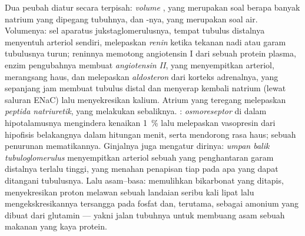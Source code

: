 \begin{definition}[Kendalinya]\label{def:b3:renal-osmoregulation:controls}
%
Dua peubah diatur secara terpisah: \emph{volume}
, yang merupakan soal berapa banyak natrium yang dipegang
tubuhnya, dan \emph{}-nya, yang merupakan soal air. Volumenya:
sel aparatus jukstaglomerulusnya, tempat tubulus distalnya
menyentuh arteriol  sendiri, melepaskan \emph{renin} ketika
tekanan nadi atau garam tubulusnya turun; reninnya memotong angiotensin I
dari sebuah protein plasma, enzim pengubahnya membuat \emph{angiotensin II},
yang menyempitkan arteriol, merangsang haus, dan melepaskan
\emph{aldosteron} dari korteks adrenalnya, yang sepanjang jam membuat
tubulus distal dan  menyerap kembali natrium (lewat saluran
ENaC) lalu menyekresikan kalium. Atrium yang teregang melepaskan
\emph{peptida natriuretik}, yang melakukan sebaliknya. :
\emph{osmoreseptor} di dalam hipotalamusnya mengindera kenaikan \qty{1}{\%} lalu
melepaskan vasopresin dari hipofisis belakangnya dalam hitungan menit, serta
mendorong rasa haus; sebuah penurunan mematikannya. Ginjalnya juga mengatur dirinya:
\emph{umpan balik tubuloglomerulus} menyempitkan arteriol sebuah
 yang penghantaran garam distalnya terlalu tinggi, yang menahan penapisan tiap
 pada apa yang dapat ditangani tubulusnya. Lalu asam--basa:
 memulihkan bikarbonat yang ditapis, 
menyekresikan proton melawan sebuah landaian seribu kali lipat lalu mengekskresikannya
tersangga pada fosfat dan, terutama, sebagai amonium yang dibuat dari
glutamin --- yakni jalan tubuhnya untuk membuang asam sebuah makanan
yang kaya protein.
\end{definition}

